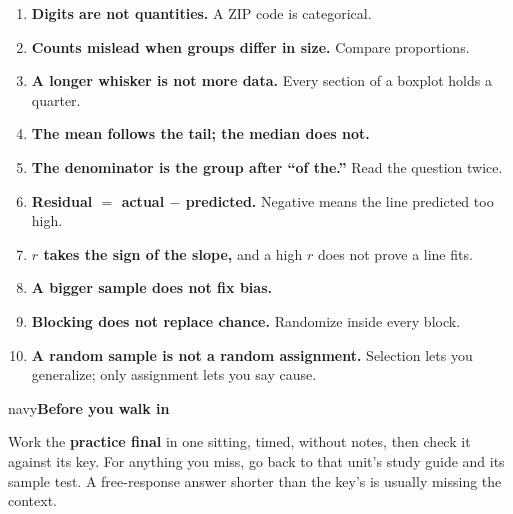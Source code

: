\documentclass[12pt]{article}
\newcommand{\sghead}[2][10]{%
  \vspace{0.13in}
  \boxguard[#1]
  \begin{headlinebox}{navy}\color{white}\bfseries\small #2\end{headlinebox}
  \vspace{0.09in}}
\begin{document}
\small
\begin{enumerate}[leftmargin=1.6em, itemsep=2pt]
  \item \textbf{Digits are not quantities.} A ZIP code is categorical.
  \item \textbf{Counts mislead when groups differ in size.} Compare proportions.
  \item \textbf{A longer whisker is not more data.} Every section of a boxplot holds a quarter.
  \item \textbf{The mean follows the tail; the median does not.}
  \item \textbf{The denominator is the group after ``of the.''} Read the question twice.
  \item \textbf{Residual $=$ actual $-$ predicted.} Negative means the line predicted too high.
  \item \textbf{$r$ takes the sign of the slope,} and a high $r$ does not prove a line fits.
  \item \textbf{A bigger sample does not fix bias.}
  \item \textbf{Blocking does not replace chance.} Randomize inside every block.
  \item \textbf{A random sample is not a random assignment.} Selection lets you generalize; only
        assignment lets you say cause.
\end{enumerate}
\normalsize

\sghead[6]{Before you walk in}

\small
Work the \textbf{practice final} in one sitting, timed, without notes, then check it against its
key. For anything you miss, go back to that unit's study guide and its sample test. A
free-response answer shorter than the key's is usually missing the context.
\normalsize
\end{document}
